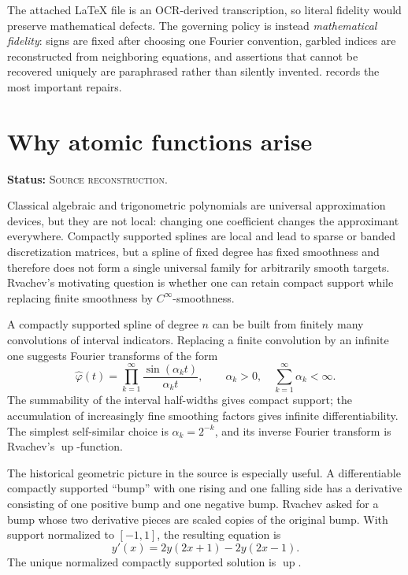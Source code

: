 \documentclass[11pt,oneside]{article}
\theoremstyle{definition}
\theoremstyle{remark}
\newcommand{\Up}{\operatorname{up}}
\newcommand{\SourceStatus}{\textcolor{SourceBlue}{\textsc{Source reconstruction}}}
\newcommand{\status}[1]{\par\smallskip\noindent\textbf{Status:} #1.\par\smallskip}
\begin{document}
The attached \LaTeX{} file is an OCR-derived transcription, so literal fidelity would preserve
mathematical defects.  The governing policy is instead \emph{mathematical fidelity}: signs are
fixed after choosing one Fourier convention, garbled indices are reconstructed from neighboring
equations, and assertions that cannot be recovered uniquely are paraphrased rather than silently
invented.   records the most important repairs.

\section{Why atomic functions arise}
\status{\SourceStatus}

Classical algebraic and trigonometric polynomials are universal approximation devices, but they are not local: changing one coefficient changes the approximant everywhere.  Compactly supported splines are local and lead to sparse or banded discretization matrices, but a spline of fixed degree has fixed smoothness and therefore does not form a single universal family for arbitrarily smooth targets.  Rvachev's motivating question is whether one can retain compact support while replacing finite smoothness by \(C^\infty\)-smoothness.

A compactly supported spline of degree \(n\) can be built from finitely many convolutions of interval indicators.  Replacing a finite convolution by an infinite one suggests Fourier transforms of the form
\begin{equation}
  \widehat\varphi(t)=\prod_{k=1}^{\infty}\frac{\sin(\alpha_k t)}{\alpha_k t},
  \qquad \alpha_k>0,\quad \sum_{k=1}^{\infty}\alpha_k<\infty.
  \label{eq:generic-sinc-product}
\end{equation}
The summability of the interval half-widths gives compact support; the accumulation of increasingly fine smoothing factors gives infinite differentiability.  The simplest self-similar choice is \(\alpha_k=2^{-k}\), and its inverse Fourier transform is Rvachev's \(\Up\)-function.

The historical geometric picture in the source is especially useful.  A differentiable compactly supported ``bump'' with one rising and one falling side has a derivative consisting of one positive bump and one negative bump.  Rvachev asked for a bump whose two derivative pieces are scaled copies of the original bump.  With support normalized to \([-1,1]\), the resulting equation is
\begin{equation}
  y'(x)=2y(2x+1)-2y(2x-1).
  \label{eq:up-dfe-intro}
\end{equation}
The unique normalized compactly supported solution is \(\Up\).
\end{document}
